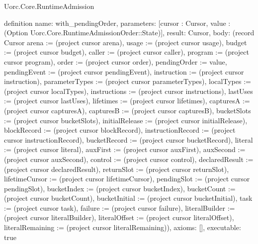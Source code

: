 \begin{lexlean}{Uorc.Core.RuntimeAdmission}
\begin{semanticmodule}
definition{
  name: with_pendingOrder,
  parameters: [cursor : Cursor, value : (Option Uorc.Core.RuntimeAdmissionOrder::State)],
  result: Cursor,
  body: (record Cursor {arena := (project cursor arena), usage := (project cursor usage), budget := (project cursor budget), caller := (project cursor caller), program := (project cursor program), order := (project cursor order), pendingOrder := value, pendingEvent := (project cursor pendingEvent), instruction := (project cursor instruction), parameterTypes := (project cursor parameterTypes), localTypes := (project cursor localTypes), instructions := (project cursor instructions), lastUses := (project cursor lastUses), lifetimes := (project cursor lifetimes), capturesA := (project cursor capturesA), capturesB := (project cursor capturesB), bucketSlots := (project cursor bucketSlots), initialRelease := (project cursor initialRelease), blockRecord := (project cursor blockRecord), instructionRecord := (project cursor instructionRecord), bucketRecord := (project cursor bucketRecord), literal := (project cursor literal), auxFirst := (project cursor auxFirst), auxSecond := (project cursor auxSecond), control := (project cursor control), declaredResult := (project cursor declaredResult), returnSlot := (project cursor returnSlot), lifetimeCursor := (project cursor lifetimeCursor), pendingSlot := (project cursor pendingSlot), bucketIndex := (project cursor bucketIndex), bucketCount := (project cursor bucketCount), bucketInitial := (project cursor bucketInitial), task := (project cursor task), failure := (project cursor failure), literalBuilder := (project cursor literalBuilder), literalOffset := (project cursor literalOffset), literalRemaining := (project cursor literalRemaining)}),
  axioms: [],
  executable: true
}


\end{semanticmodule}
\end{lexlean}

